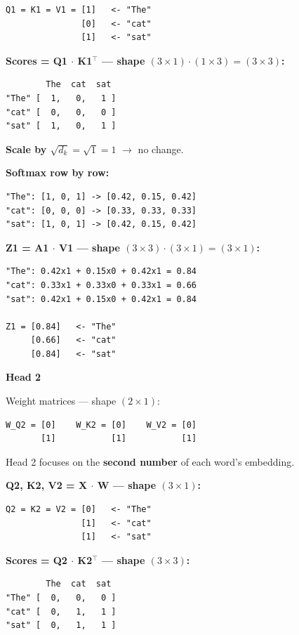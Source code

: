 \begin{verbatim}
Q1 = K1 = V1 = [1]   <- "The"
               [0]   <- "cat"
               [1]   <- "sat"
\end{verbatim}

\textbf{Scores = Q1 $\cdot$ K1$^\top$ --- shape $(3\times1)\cdot(1\times3) = (3\times3)$:}

\begin{verbatim}
        The  cat  sat
"The" [  1,   0,   1 ]
"cat" [  0,   0,   0 ]
"sat" [  1,   0,   1 ]
\end{verbatim}

\textbf{Scale by $\sqrt{d_k} = \sqrt{1} = 1$} $\to$ no change.

\textbf{Softmax row by row:}

\begin{verbatim}
"The": [1, 0, 1] -> [0.42, 0.15, 0.42]
"cat": [0, 0, 0] -> [0.33, 0.33, 0.33]
"sat": [1, 0, 1] -> [0.42, 0.15, 0.42]
\end{verbatim}

\textbf{Z1 = A1 $\cdot$ V1 --- shape $(3\times3)\cdot(3\times1) = (3\times1)$:}

\begin{verbatim}
"The": 0.42x1 + 0.15x0 + 0.42x1 = 0.84
"cat": 0.33x1 + 0.33x0 + 0.33x1 = 0.66
"sat": 0.42x1 + 0.15x0 + 0.42x1 = 0.84

Z1 = [0.84]   <- "The"
     [0.66]   <- "cat"
     [0.84]   <- "sat"
\end{verbatim}

\medskip
\textbf{Head 2}

Weight matrices --- shape $(2 \times 1)$:

\begin{verbatim}
W_Q2 = [0]    W_K2 = [0]    W_V2 = [0]
       [1]           [1]           [1]
\end{verbatim}

Head 2 focuses on the \textbf{second number} of each word's embedding.

\textbf{Q2, K2, V2 = X $\cdot$ W --- shape $(3 \times 1)$:}

\begin{verbatim}
Q2 = K2 = V2 = [0]   <- "The"
               [1]   <- "cat"
               [1]   <- "sat"
\end{verbatim}

\textbf{Scores = Q2 $\cdot$ K2$^\top$ --- shape $(3\times3)$:}

\begin{verbatim}
        The  cat  sat
"The" [  0,   0,   0 ]
"cat" [  0,   1,   1 ]
"sat" [  0,   1,   1 ]
\end{verbatim}

